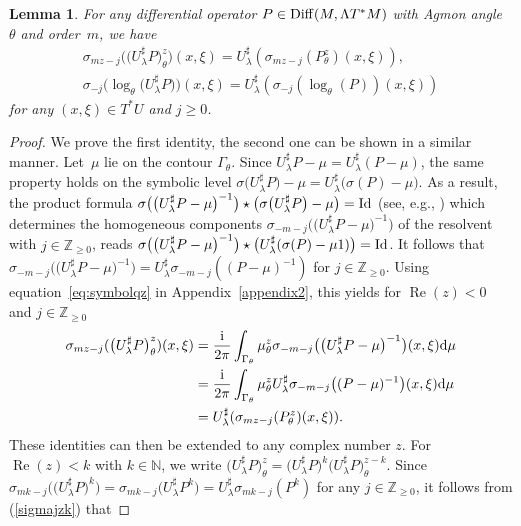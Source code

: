 \documentclass[10pt,a4paper]{amsart}
\numberwithin{equation}{section}
\newtheorem{lem}[thm]{Lemma}
\theoremstyle{definition}
\newcommand{\Z}{\mathbb Z}
\newcommand{\N}{\mathbb N}
\begin{document}
\begin{lem} For any differential operator $P\in {\rm Diff}(M,\Lambda T^*M)$ with Agmon angle $\theta$ and order~$m$, we have
	\begin{gather}
		\sigma_{mz-j}\bigl(\bigl(U_\lambda^\sharp P\bigr)_\theta^z\bigr)(x,\xi) = U_\lambda^\sharp (\sigma_{mz-j}(P_\theta^z)(x,\xi) ),\nonumber \\
		\sigma_{-j}\bigl( \log_\theta\bigl(U_\lambda^\sharp P\bigr)\bigr)(x,\xi) = U_\lambda^\sharp (\sigma_{-j}(\log_\theta(P))(x,\xi) )\label{eq:ulambdasharpdef}
	\end{gather}
	for any $(x,\xi)\in T^*U$ and $j\geq 0$.
\end{lem}
\begin{proof} We prove the first identity, the second one can be shown in a similar manner. Let~$\mu$ lie on the contour $\Gamma_\theta$. Since
		$ U_\lambda^\sharp P-\mu= U_\lambda^\sharp (P-\mu) $, the same property holds on the symbolic level 	$ \sigma\bigl(U_\lambda^\sharp P\bigr)-\mu = U_\lambda^\sharp\bigl( \sigma (P)-\mu \bigr)$. As a result, the product formula $\sigma\bigl(\bigl( U_\lambda^\sharp P-\mu\bigr)^{-1}\bigr)\star \bigl(\sigma\bigl(U_\lambda^\sharp P\bigr)-\mu \bigr)={\rm Id}$ (see, e.g., \cite[equation~(4.8.2.2)]{Sc}) which determines the homogeneous components $\sigma_{-m-j}\bigl(\bigl( U_\lambda^\sharp P-\mu\bigr)^{-1}\bigr)$ of the resolvent with $j\in \Z_{\geq 0}$, reads $\sigma\bigl(\bigl( U_\lambda^\sharp P-\mu\bigr)^{-1}\bigr)\star \bigl(U_\lambda^\sharp(\sigma( P)-\mu 1)\bigr)={\rm Id}$. It follows that $\sigma_{-m-j}\bigl(\bigl( U_\lambda^\sharp P-\mu\bigr)^{-1}\bigr)
		=U_\lambda^\sharp\sigma_{-m-j}\left(( P-\mu)^{-1}\right)$ for $j\in \Z_{\geq 0}$. { Using equation~\eqref{eq:symbolqz} in Appendix~\ref{appendix2}}, this yields for $\operatorname{Re}(z)<0$ and $j\in \Z_{\geq 0}$
\begin{align*}
\sigma_{mz-j}( \bigl(U_\lambda^\sharp P\bigr)_\theta^z)(x,\xi)&{}= \frac{{\rm i}}{2\pi} \int_{\Gamma_\theta} \mu_\theta^z \sigma_{-m-j}\bigl(\bigl(U_\lambda^\sharp P-\mu\bigr)^{-1}\bigr)(x,\xi) {\rm d}\mu\\
&{}= \frac{{\rm i}}{2\pi} \int_{\Gamma_\theta} \mu_\theta^z U_\lambda^\sharp\sigma_{-m-j}\bigl((P-\mu)^{-1}\bigr)(x,\xi) {\rm d}\mu\\
&{}= U_\lambda^\sharp(\sigma_{mz-j}(P_\theta^{z})(x,\xi)).
\end{align*}
These identities can then be extended to any complex number $z$. For $\operatorname{Re}(z)<k$ with $k\in \N$, we write $\bigl(U_\lambda^\sharp P\bigr)_\theta^z= \bigl(U_\lambda^\sharp P\bigr)^k \bigl(U_\lambda^\sharp P\bigr)_\theta^{z-k}$. Since $ \sigma_{mk-j} \bigl(\bigl(U_\lambda^\sharp P\bigr)^k\bigr)= \sigma_{mk-j} \bigl(U_\lambda^\sharp P^k\bigr)= U_\lambda^\sharp\sigma_{mk-j} ( P^k)$ for any $j\in \Z_{\geq 0}$, it follows from (\ref{sigmajzk}) that

\end{proof}
\end{document}

